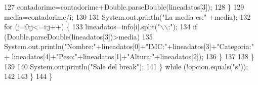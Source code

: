 \begin{DoxyCode}
127                     contadorimc=contadorimc+Double.parseDouble(lineadatos[3]);
128                 \}
129                 media=contadorimc/i;
130                 
131                 System.out.println(\textcolor{stringliteral}{"La media es:"} +media);
132                 \textcolor{keywordflow}{for} (j=0;j<=i;j++) \{
133                     lineadatos=info[i].split(\textcolor{stringliteral}{"\(\backslash\)\(\backslash\):"});
134                     \textcolor{keywordflow}{if} (Double.parseDouble(lineadatos[3])>media)
135                         System.out.println(\textcolor{stringliteral}{"Nombre:"}+lineadatos[0]+\textcolor{stringliteral}{"IMC:"}+lineadatos[3]+\textcolor{stringliteral}{"Categoria:"}+
      lineadatos[4]+\textcolor{stringliteral}{"Peso:"}+lineadatos[1]+\textcolor{stringliteral}{"Altura:"}+lineadatos[2]);
136                 \}
137                 
138         \}
139         
140                                 System.out.println(\textcolor{stringliteral}{"Sale del break"});
141         \} \textcolor{keywordflow}{while} (!opcion.equals(\textcolor{stringliteral}{"s"}));
142         
143     \}
144 \}
\end{DoxyCode}
